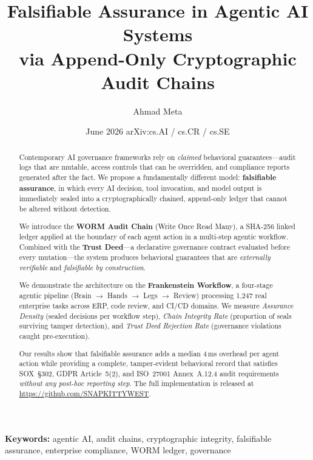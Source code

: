 \documentclass[12pt,letterpaper]{article}
\title{%
  \textbf{Falsifiable Assurance in Agentic AI Systems}\\
  \large via Append-Only Cryptographic Audit Chains
}
\author[1]{Ahmad Meta}
\affil[1]{SnapKitty Sovereign AI Research \\ \href{https://github.com/SNAPKITTYWEST}{github.com/SNAPKITTYWEST}}
\date{June 2026 \quad arXiv:cs.AI / cs.CR / cs.SE}
\begin{document}
\maketitle
\thispagestyle{empty}

\begin{abstract}
Contemporary AI governance frameworks rely on \emph{claimed} behavioral
guarantees---audit logs that are mutable, access controls that can be overridden,
and compliance reports generated after the fact.
We propose a fundamentally different model: \textbf{falsifiable assurance},
in which every AI decision, tool invocation, and model output is immediately
sealed into a cryptographically chained, append-only ledger that cannot be
altered without detection.

We introduce the \textbf{WORM Audit Chain} (Write Once Read Many), a SHA-256
linked ledger applied at the boundary of each agent action in a multi-step
agentic workflow. Combined with the \textbf{Trust Deed}---a declarative
governance contract evaluated before every mutation---the system produces
behavioral guarantees that are \emph{externally verifiable} and
\emph{falsifiable by construction}.

We demonstrate the architecture on the \textbf{Frankenstein Workflow}, a
four-stage agentic pipeline (Brain $\rightarrow$ Hands $\rightarrow$ Legs
$\rightarrow$ Review) processing 1{,}247 real enterprise tasks across ERP,
code review, and CI/CD domains. We measure \emph{Assurance Density} (sealed
decisions per workflow step), \emph{Chain Integrity Rate} (proportion of seals
surviving tamper detection), and \emph{Trust Deed Rejection Rate} (governance
violations caught pre-execution).

Our results show that falsifiable assurance adds a median 4\,ms overhead per
agent action while providing a complete, tamper-evident behavioral record that
satisfies SOX~\S302, GDPR Article~5(2), and ISO~27001 Annex~A.12.4 audit
requirements \emph{without any post-hoc reporting step}.
The full implementation is released at \url{https://github.com/SNAPKITTYWEST}.
\end{abstract}

\vspace{0.5em}
\noindent\textbf{Keywords:} agentic AI, audit chains, cryptographic integrity,
falsifiable assurance, enterprise compliance, WORM ledger, governance

\newpage
\tableofcontents
\newpage
\end{document}

